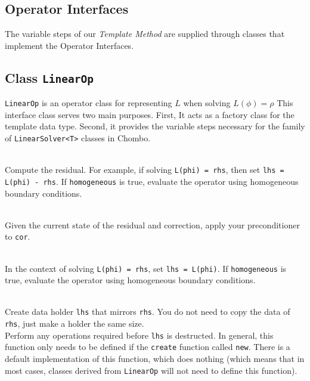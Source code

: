 \begin{itemize}
\begin{itemize}
\begin{itemize}
\begin{itemize}
\begin{itemize}
\begin{itemize}
\begin{itemize}
\section{Operator Interfaces}
  
  The variable steps of our {\em Template Method} are supplied through classes that implement
the Operator Interfaces.  

\subsection{Class {\tt LinearOp}}

 {\tt LinearOp} is an operator class for  representing $L$ 
when solving $ L(\phi) = \rho$
This interface class serves two main purposes.  First, It acts as a
factory class for the template data type. Second, it provides the
variable steps necessary for the family  
of {\tt LinearSolver<T>} classes in Chombo.
\begin{itemize}

\\ Compute the residual.  For example, if solving {\tt L(phi) = rhs},
then set {\tt lhs = L(phi) - rhs}.
If {\tt homogeneous} is true, evaluate the operator using homogeneous boundary conditions.

\\ Given the current state of the residual and correction, apply your preconditioner to {\tt cor}.

\\ In the context of solving {\tt L(phi) = rhs}, set {\tt lhs = L(phi)}.
If {\tt homogeneous} is true, evaluate the operator using homogeneous boundary conditions.


\\Create data holder {\tt lhs} that mirrors {\tt rhs}.
You do not need to copy the data of {\tt rhs}, just make a holder the same size.
\\Perform any operations required before {\tt lhs} is destructed. In general, this function only needs to be defined if the {\tt create} function called {\tt new}. There is a default implementation of this function, which does nothing (which means that in most cases, classes derived from {\tt LinearOp} will not need to define this function).



\end{itemize}
\end{itemize}
\end{itemize}
\end{itemize}
\end{itemize}
\end{itemize}
\end{itemize}
\end{itemize}
